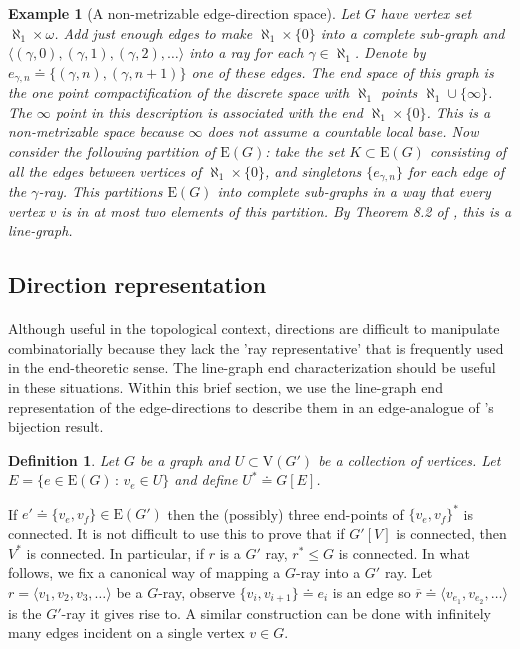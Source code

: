 \documentclass[10pt]{article}
\numberwithin{equation}{subsection}
\newtheorem{definition}[equation]{Definition}
\newtheorem{example}[equation]{Example}
\theoremstyle{remark}
\newcommand{\st}{\, : \,}
\begin{document}
\begin{example}[A non-metrizable edge-direction space]
    \label{nonmetdirection}
    Let $G$ have vertex set $\aleph_1 \times \omega$. Add just enough edges to make $\aleph_1 \times \{0\}$ into a complete sub-graph and $\langle (\gamma,0),(\gamma,1),(\gamma,2),\dots\rangle$ into a ray for each $\gamma \in \aleph_1$. Denote by $e_{\gamma,n} \doteq \{(\gamma,n),(\gamma,n+1)\}$ one of these edges. The end space of this graph is the one point compactification of the discrete space with $\aleph_1$ points $\aleph_1 \cup \{\infty\}$. The $\infty$ point in this description is associated with the end $\aleph_1 \times \{0\}$. This is a non-metrizable space because $\infty$ does not assume a countable local base. Now consider the following partition of $\mathrm{E}(G)$: take the set $K \subset \mathrm{E}(G)$ consisting of all the edges between vertices of $\aleph_1 \times \{0\}$, and singletons $\{e_{\gamma,n}\}$ for each edge of the $\gamma$-ray. This partitions $\mathrm{E}(G)$ into complete sub-graphs in a way that every vertex $v$ is in at most two elements of this partition. By Theorem 8.2 of \cite{harary}, this is a line-graph.
\end{example}

\subsection{Direction representation}
\label{directionrepsection}

\paragraph{}
Although useful in the topological context, directions are difficult to manipulate combinatorially because they lack the 'ray representative' that is frequently used in the end-theoretic sense. The line-graph end characterization should be useful in these situations. Within this brief section, we use the line-graph end representation of the edge-directions to describe them in an edge-analogue of \cite{DIESTEL2003197}'s bijection result.

\begin{definition}
    Let $G$ be a graph and $U \subset \mathrm{V}(G')$ be a collection of vertices. Let $E = \{e \in \mathrm{E}(G) \st v_e \in U\}$ and define $U^* \doteq G[E]$. 
\end{definition}

If $e' \doteq \{v_{e}, v_f\} \in \mathrm{E}(G')$ then the (possibly) three end-points of $\{v_e,v_f\}^*$ is connected. It is not difficult to use this to prove that if $G'[V]$ is connected, then $V^*$ is connected. In particular, if $r$ is a $G'$ ray, $r^* \leq G$ is connected. In what follows, we fix a canonical way of mapping a $G$-ray into a $G'$ ray. Let $r = \langle v_1,v_2,v_3,\dots \rangle $ be a $G$-ray, observe $\{v_i,v_{i+1}\} \doteq e_i$ is an edge so $\overline{r} \doteq \langle v_{e_1},v_{e_2},\dots\rangle$ is the $G'$-ray it gives rise to. A similar construction can be done with infinitely many edges incident on a single vertex $v \in G$.
\end{document}
